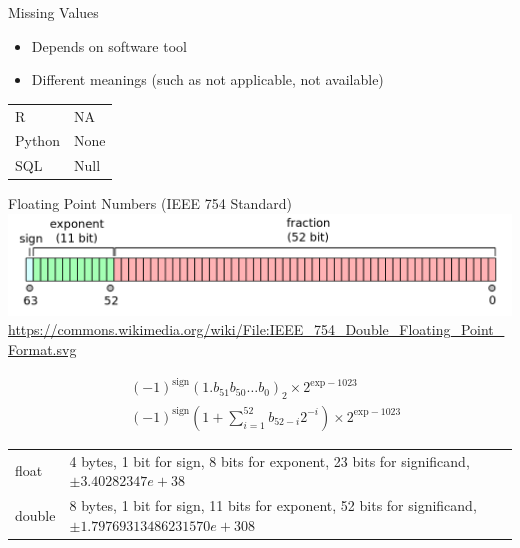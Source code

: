 \documentclass[ignorenonframetext,xcolor=x11names]{beamer}
\begin{document}
\begin{frame}{Missing Values}
\begin{itemize}
	\item Depends on software tool
	\item Different meanings (such as not applicable, not available)
\end{itemize}

\centering
\vspace{5mm}
\renewcommand{\arraystretch}{1.25}

\begin{tabular}{l|l} \hline
R &	NA \\
Python & None \\
SQL & Null \\ \hline
\end{tabular}
\end{frame}

\begin{frame}{Floating Point Numbers (IEEE 754 Standard)}
\includegraphics[width=\textwidth]{IEEE754.png}
\tiny
\url{https://commons.wikimedia.org/wiki/File:IEEE_754_Double_Floating_Point_Format.svg}
\normalsize

\begin{align*}
& (-1)^{\text{sign}} ( 1.b_{51}b_{50} \ldots b_0)_2 \times 2^{\text{exp}-1023} \\
& (-1)^{\text{sign}} \left( 1 + \sum_{i=1}^{52} b_{52-i}2^{-i} \right) \times 2^{\text{exp}-1023}
\end{align*}

\footnotesize
\renewcommand{\arraystretch}{1.25}

\begin{tabularx}{\textwidth}{l|X} \hline
float			& 4 bytes, 1 bit for sign, 8 bits for exponent, 23 bits for significand, $\pm 3.40282347e+38$ \\
double			& 8 bytes, 1 bit for sign, 11 bits for exponent, 52 bits for significand, $\pm 1.79769313486231570e+308$ \\ \hline
\end{tabularx}
\end{frame}
\end{document}
